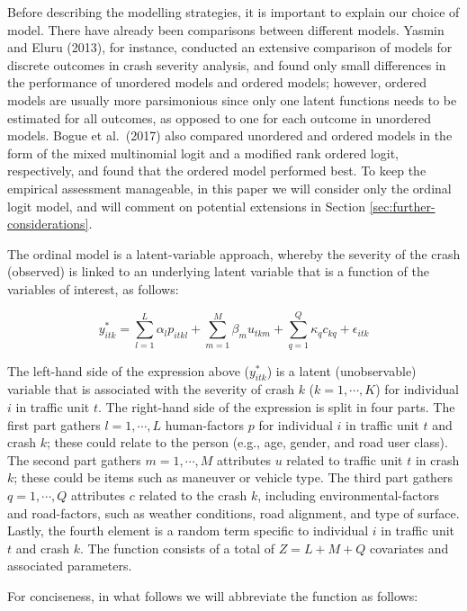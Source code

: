 \documentclass[]{elsarticle} %
\begin{document}
Before describing the modelling strategies, it is important to explain
our choice of model. There have already been comparisons between
different models. Yasmin and Eluru (2013), for instance, conducted an
extensive comparison of models for discrete outcomes in crash severity
analysis, and found only small differences in the performance of
unordered models and ordered models; however, ordered models are usually
more parsimonious since only one latent functions needs to be estimated
for all outcomes, as opposed to one for each outcome in unordered
models. Bogue et al.~(2017) also compared unordered and ordered models
in the form of the mixed multinomial logit and a modified rank ordered
logit, respectively, and found that the ordered model performed best. To
keep the empirical assessment manageable, in this paper we will consider
only the ordinal logit model, and will comment on potential extensions
in Section \ref{sec:further-considerations}.

The ordinal model is a latent-variable approach, whereby the severity of
the crash (observed) is linked to an underlying latent variable that is
a function of the variables of interest, as follows:

\begin{equation}
\label{eq:latent-function}
y_{itk}^*=\sum_{l=1}^L\alpha_lp_{itkl} + \sum_{m=1}^M\beta_mu_{tkm} + \sum_{q=1}^Q\kappa_qc_{kq} + \epsilon_{itk}
\end{equation}

The left-hand side of the expression above (\(y_{itk}^*\)) is a latent
(unobservable) variable that is associated with the severity of crash
\(k\) (\(k=1,\cdots,K\)) for individual \(i\) in traffic unit \(t\). The
right-hand side of the expression is split in four parts. The first part
gathers \(l=1,\cdots,L\) human-factors \(p\) for individual \(i\) in
traffic unit \(t\) and crash \(k\); these could relate to the person
(e.g., age, gender, and road user class). The second part gathers
\(m=1,\cdots,M\) attributes \(u\) related to traffic unit \(t\) in crash
\(k\); these could be items such as maneuver or vehicle type. The third
part gathers \(q=1,\cdots,Q\) attributes \(c\) related to the crash
\(k\), including environmental-factors and road-factors, such as weather
conditions, road alignment, and type of surface. Lastly, the fourth
element is a random term specific to individual \(i\) in traffic unit
\(t\) and crash \(k\). The function consists of a total of \(Z=L+M+Q\)
covariates and associated parameters.

For conciseness, in what follows we will abbreviate the function as
follows:
\end{document}
